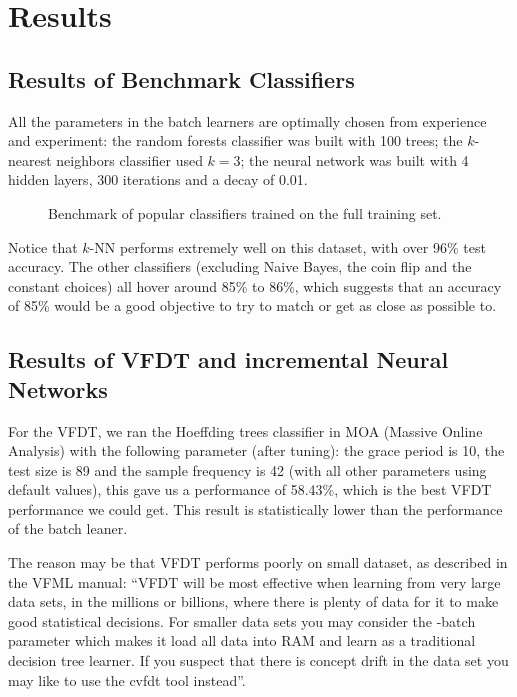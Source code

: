 \documentclass[conference]{IEEEtran}
\begin{document}
		\section{Results}
		\label{sec:experiments-and-results}
		
		\subsection{Results of Benchmark Classifiers}
		All the parameters in the batch learners are optimally chosen from experience and experiment: the random forests classifier was built with 100 trees; the $k$-nearest neighbors classifier used $k=3$; the neural network was built with 4 hidden layers, 300 iterations and a decay of 0.01.
		
		\begin{figure}[H]
			\centering
			\caption{Benchmark of popular classifiers trained on the full training set.}
			\label{fig:benchmark}
		\end{figure}
		
		Notice that $k$-NN performs extremely well on this dataset, with over 96\% test accuracy. The other classifiers (excluding Naive Bayes, the coin flip and the constant choices) all hover around 85\% to 86\%, which suggests that an accuracy of 85\% would be a good objective to try to match or get as close as possible to.
		
		\subsection{Results of VFDT and incremental Neural Networks}
		For the VFDT, we ran the Hoeffding trees classifier in MOA (Massive Online Analysis) with the following parameter (after tuning): the grace period is 10, the test size is 89 and the sample frequency is 42 (with all other parameters using default values), this gave us a performance of 58.43\%, which is the best VFDT performance we could get. This result is statistically lower than the performance of the batch leaner.
		
		The reason may be that VFDT performs poorly on small dataset, as described in the VFML manual\cite{VFML}: ``VFDT  will be most effective when learning from very large data sets, in the millions or billions, where there is plenty of data for it to make good statistical decisions. For smaller data sets you may consider the -batch parameter which makes it load all data into RAM and learn as a traditional decision tree learner. If you suspect that there is concept drift in the data set you may like to use the cvfdt tool instead''.
		
\end{document}
